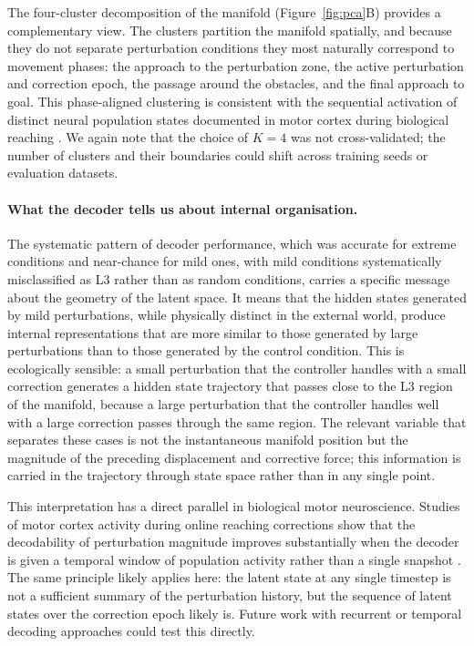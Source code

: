 \documentclass{article}
\begin{document}
The four-cluster decomposition of the manifold (Figure~\ref{fig:pca}B)
provides a complementary view.
The clusters partition the manifold spatially, and because they do not
separate perturbation conditions they most naturally correspond to movement
phases: the approach to the perturbation zone, the active perturbation
and correction epoch, the passage around the obstacles, and the final
approach to goal.
This phase-aligned clustering is consistent with the sequential activation
of distinct neural population states documented in motor cortex during
biological reaching \citep{Churchland2012,Shenoy2013,Kaufman2014,Elsayed2016,Georgopoulos1986}.
We again note that the choice of $K=4$ was not cross-validated; the number
of clusters and their boundaries could shift across training seeds or
evaluation datasets.

\paragraph{What the decoder tells us about internal organisation.}

The systematic pattern of decoder performance, which was accurate for
extreme conditions and near-chance for mild ones, with mild conditions
systematically misclassified as L3 rather than as random conditions,
carries a specific message about the geometry of the latent space.
It means that the hidden states generated by mild perturbations, while
physically distinct in the external world, produce internal
representations that are more similar to those generated by large
perturbations than to those generated by the control condition.
This is ecologically sensible: a small perturbation that the controller
handles with a small correction generates a hidden state trajectory that
passes close to the L3 region of the manifold, because a large
perturbation that the controller handles well with a large correction
passes through the same region.
The relevant variable that separates these cases is not the instantaneous
manifold position but the magnitude of the preceding displacement and
corrective force; this information is carried in the trajectory through
state space rather than in any single point.

This interpretation has a direct parallel in biological motor
neuroscience.
Studies of motor cortex activity during online reaching corrections show
that the decodability of perturbation magnitude improves substantially
when the decoder is given a temporal window of population activity rather
than a single snapshot \citep{Nashed2014,Churchland2012,Sadtler2014,Perich2018}.
The same principle likely applies here: the latent state at any single
timestep is not a sufficient summary of the perturbation history, but the
sequence of latent states over the correction epoch likely is.
Future work with recurrent or temporal decoding approaches could test this
directly.
\end{document}
